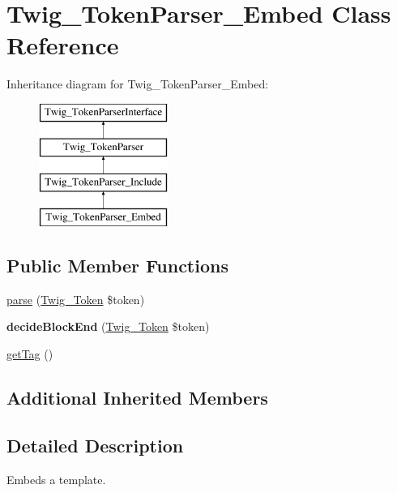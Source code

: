 \hypertarget{classTwig__TokenParser__Embed}{}\section{Twig\+\_\+\+Token\+Parser\+\_\+\+Embed Class Reference}
\label{classTwig__TokenParser__Embed}
Inheritance diagram for Twig\+\_\+\+Token\+Parser\+\_\+\+Embed\+:\begin{figure}[H]
\begin{center}
\leavevmode
\includegraphics[height=4.000000cm]{classTwig__TokenParser__Embed}
\end{center}
\end{figure}
\subsection*{Public Member Functions}
\begin{DoxyCompactItemize}
\item 
\hyperlink{classTwig__TokenParser__Embed_ada7b1f78922d2deb3bbf19043e8681b2}{parse} (\hyperlink{classTwig__Token}{Twig\+\_\+\+Token} \$token)
\item 
{\bfseries decide\+Block\+End} (\hyperlink{classTwig__Token}{Twig\+\_\+\+Token} \$token)\hypertarget{classTwig__TokenParser__Embed_ab839d08925799881494e1be6117f6035}{}\label{classTwig__TokenParser__Embed_ab839d08925799881494e1be6117f6035}

\item 
\hyperlink{classTwig__TokenParser__Embed_a584602b478abdb170bc6ddc6c6c0b46d}{get\+Tag} ()
\end{DoxyCompactItemize}
\subsection*{Additional Inherited Members}


\subsection{Detailed Description}
Embeds a template. 

